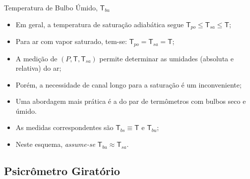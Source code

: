     \begin{frame}{Temperatura de Bulbo Úmido, $\mathsf{T}_{bu}$}\vspace*{-0em}
        \begin{itemize}
            \item<1-> Em geral, a temperatura de saturação adiabática segue
                \alert{$\mathsf{T}_{po} \leqslant \mathsf{T}_{sa} \leqslant \mathsf{T}$};
                \\[\medskipamount]
            \item<2-> Para ar com vapor saturado, tem-se: \alert{$\mathsf{T}_{po} =
                \mathsf{T}_{sa} = \mathsf{T}$};
                \\[\medskipamount]
            \item<3-> A medição de \alert{$(P, \mathsf{T}, \mathsf{T}_{sa})$} permite determinar
                as umidades (absoluta e relativa) do ar;
                \\[\medskipamount]
            \item<4-> Porém, a necessidade de \alert{canal longo} para a saturação é um
                inconveniente;
                \\[\medskipamount]
            \item<5-> Uma abordagem mais prática é a do \alert{par} de termômetros com
                \alert{bulbos seco e úmido}.
                \\[\medskipamount]
            \item<6-> As medidas correspondentes são \alert{$\mathsf{T}_{bs} \equiv \mathsf{T}$}
                e \alert{$\mathsf{T}_{bu}$};
                \\[\medskipamount]
            \item<7-> Neste esquema, \alert{\textit{assume-se} $\mathsf{T}_{bu} \approx
                \mathsf{T}_{sa}$}.
        \end{itemize}
    \end{frame}

\subsection{Psicrômetro Giratório}

